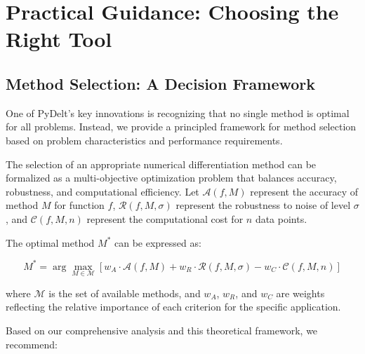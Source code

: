\documentclass[10pt,journal,compsoc]{IEEEtran}
\begin{document}
\section{Practical Guidance: Choosing the Right Tool}

\subsection{Method Selection: A Decision Framework}

One of PyDelt's key innovations is recognizing that no single method is optimal for all problems. Instead, we provide a principled framework for method selection based on problem characteristics and performance requirements.

The selection of an appropriate numerical differentiation method can be formalized as a multi-objective optimization problem that balances accuracy, robustness, and computational efficiency. Let $\mathcal{A}(f, M)$ represent the accuracy of method $M$ for function $f$, $\mathcal{R}(f, M, \sigma)$ represent the robustness to noise of level $\sigma$, and $\mathcal{C}(f, M, n)$ represent the computational cost for $n$ data points.

The optimal method $M^*$ can be expressed as:

\begin{equation}
    M^* = \arg\max_{M \in \mathcal{M}} \left[ w_A \cdot \mathcal{A}(f, M) + w_R \cdot \mathcal{R}(f, M, \sigma) - w_C \cdot \mathcal{C}(f, M, n) \right]
\end{equation}

where $\mathcal{M}$ is the set of available methods, and $w_A$, $w_R$, and $w_C$ are weights reflecting the relative importance of each criterion for the specific application.

Based on our comprehensive analysis and this theoretical framework, we recommend:
\end{document}
